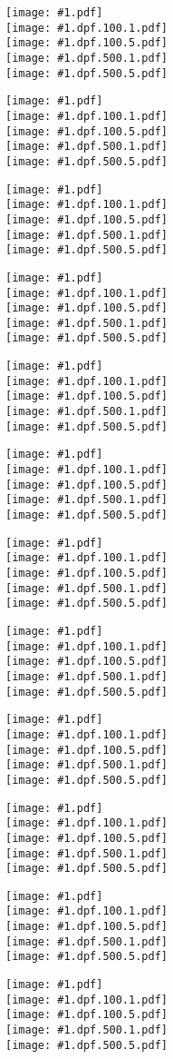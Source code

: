 \documentclass{article}
\begin{document}
\def\w{\linewidth}


\newcount\K
\def\putfigure#1{%
 \begin{center}
  \texttt{[image: \#1.pdf]}\\
  \texttt{[image: \#1.dpf.100.1.pdf]}\\
  \texttt{[image: \#1.dpf.100.5.pdf]}\\
  \texttt{[image: \#1.dpf.500.1.pdf]}\\
  \texttt{[image: \#1.dpf.500.5.pdf]}\\
  \end{center}
  \newpage}



\putfigure{A_NBI11-10153A}
\putfigure{A_NBI11-10200A}
\putfigure{A_NBI11-10200B}
\putfigure{A_NBI11-10230}
\putfigure{B_NBI11-10153B}
\putfigure{B_NBI11-10155}
\putfigure{B_NBI11-10161}
\putfigure{B_NBI11-10179}
\putfigure{B_NBI11-10201B}
\putfigure{C_NBI11_10244}
\putfigure{C_NBI11_IIa+IIc_1}
\putfigure{C_NBI11_IIa+IIc_2}

 

 
\end{document}
